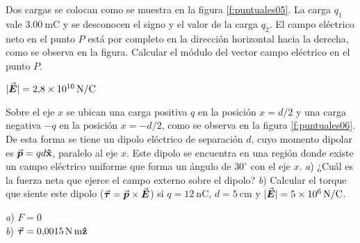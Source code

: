 %
\begin{Exercise}\label{p:puntuales05}
  Dos cargas se colocan como se muestra en la figura \ref{f:puntuales05}. La carga $q_1$ vale $\SI{3.00}{\milli\coulomb}$ y se desconocen el signo y el valor de la carga $q_2$. El campo eléctrico neto en el punto $P$ está por completo en la dirección horizontal hacia la derecha, como se observa en la figura. Calcular el módulo del vector campo eléctrico en el punto $P$.
\end{Exercise}
\begin{Answer}
  $|\va*{E}| = \SI{2.8E10}{\newton/\coulomb}$
\end{Answer}
%
\begin{center}
\end{center}
%
\begin{Exercise}\label{p:puntuales06}
  Sobre el eje $x$ se ubican una carga positiva $q$ en la posición $x = d/2$ y una carga negativa $-q$ en la posición $x = -d/2$, como se observa en la figura \ref{f:puntuales06}. De esta forma se tiene un dipolo eléctrico de separación $d$, cuyo momento dipolar es $\va*{p}=qd\vu{x}$, paralelo al eje $x$. Este dipolo se encuentra en una región donde existe un campo eléctrico uniforme que forma un ángulo de $30^\circ$ con el eje $x$. \textit{a}) ¿Cuál es la fuerza neta que ejerce el campo externo sobre el dipolo? \textit{b}) Calcular el torque que siente este dipolo ($\va*{\tau} = \va*{p} \times \va*{E}$) si $q = \SI{12}{\nano\coulomb}$, $d = \SI{5}{\centi\metre}$ y $|\va*{E}| = \SI{5E6}{\newton/\coulomb}$.
\end{Exercise}
\begin{Answer}
  \begin{minipage}[t]{.4\textwidth}
    \textit{a}) $F = 0$\\ \textit{b}) $\va*{\tau} = \SI{0.0015}{\newton.\metre}\vu{z}$
  \end{minipage}
\end{Answer}
